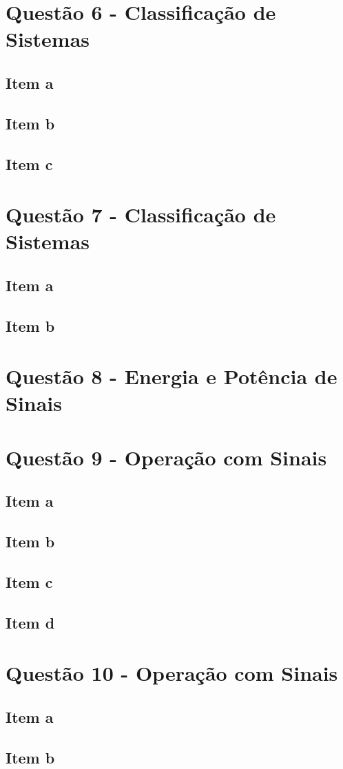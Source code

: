 \documentclass[a4paper, 12pt]{article}
\begin{document}
	\section{Quest\~{a}o 6 - Classificação de Sistemas}			
		\subsection{Item a}	
		\subsection{Item b}	
		\subsection{Item c}		
	\section{Quest\~{a}o 7 - Classificação de Sistemas}			
		\subsection{Item a}	
		\subsection{Item b}			
	\section{Quest\~{a}o 8 - Energia e Potência de Sinais}	
	\section{Quest\~{a}o 9 - Operação com Sinais}
		\subsection{Item a}	
		\subsection{Item b}	
		\subsection{Item c}	
		\subsection{Item d}		
	\section{Quest\~{a}o 10 - Operação com Sinais}
		\subsection{Item a}	
		\subsection{Item b}					
		


		
\end{document}
